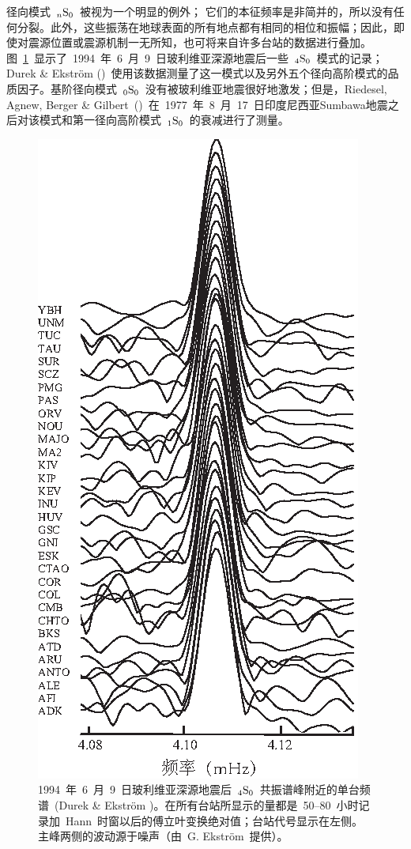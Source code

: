 径向模式~${}_n{\rm S}_0$~被视为一个明显的例外；
%
%
%
%
它们的本征频率是非简并的，所以没有任何分裂。此外，这些振荡在地球表面的所有地点都有相同的相位和振幅；因此，即使对震源位置或震源机制一无所知，也可将来自许多台站的数据进行叠加。图~\ref{9.fig.4S0}~显示了~1994~年~6~月~9~日玻利维亚深源地震后一些~${}_4{\rm S}_0$~模式的记录；
%
Durek \& Ekstr\"{o}m
(\citeyear{durek&ekstrom95})~使用该数据测量了这一模式以及另外五个径向高阶模式的品质因子。基阶径向模式~${}_0{\rm S}_0$~没有被玻利维亚地震很好地激发；但是，Riedesel, Agnew, Berger \& Gilbert~(\citeyear{riedesel&al80})~在~1977~年~8~月~17~日印度尼西亚Sumbawa地震之后对该模式和第一径向高阶模式~${}_1{\rm S}_0$~的衰减进行了测量。
%
\begin{figure}[!t]
\begin{center}
\includegraphics{../figures/chap09/fig16.eps}
\end{center}
\caption[Qkernels4]{\label{9.fig.4S0}
1994~年~6~月~9~日玻利维亚深源地震后~${}_4{\rm S}_0$~共振谱峰附近的单台频谱~(Durek \& Ekstr\"{o}m \citeyear{durek&ekstrom95})。在所有台站所显示的量都是~50--80~小时记录加~Hann~时窗以后的傅立叶变换绝对值；台站代号显示在左侧。主峰两侧的波动源于噪声（由~G. Ekstr\"{o}m~提供）。
}
\end{figure}
